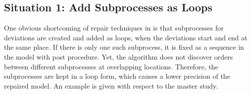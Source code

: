 \subsection{Situation 1: \small{Add Subprocesses as Loops}} %
One obvious shortcoming of repair techniques in \cite{fahland2015model} is that subprocesses for  deviations are created and added as loops, when the deviations start and end at the same place. If there is only one such subprocess, it is fixed as a sequence in the model with post procedure. Yet, the algorithm does not discover orders between different subprocesses at overlapping locations. Therefore, the subprocesses are kept in a loop form, which causes a lower precision of the repaired model. An example is given with respect to the master study. 

